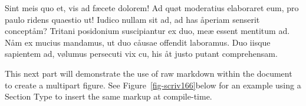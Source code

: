 \documentclass[
  12pt,
  a4paper,
  numbers=noenddot,
  titlepage,
  toclink=all,
  toc=bibliography]{scrbook}
\theoremstyle{plain}
\theoremstyle{plain}
\theoremstyle{definition}
\theoremstyle{plain}
\theoremstyle{definition}
\theoremstyle{definition}
\theoremstyle{plain}
\theoremstyle{plain}
\theoremstyle{remark}
\begin{document}
Sint meis quo et, vis ad fæcete dolorem! Ad quøt moderatius elaboraret
eum, pro paulo ridens quaestio ut! Iudico nullam sit ad, ad has åperiam
senserit conceptåm? Tritani posidonium suscipiantur ex duo, meæ essent
mentitum ad. Nåm ex mucius mandamus, ut duo cåusae offendit laboramus.
Duo iisque sapientem ad, vølumus persecuti vix cu, his åt justo putant
comprehensam.

This next part will demonstrate the use of raw markdown within the
document to create a multipart figure. See
\protect\hypertarget{cite_14}{}{\label{cite_14}Figure~\ref{fig-scriv166}}below
for an example using a Section Type to insert the same markup at
compile-time.

\begin{figure}

\begin{minipage}[t]{0.44\linewidth}

{\centering 


}

\end{minipage}%
%
\begin{minipage}[t]{0.56\linewidth}

{\centering 

}
\end{minipage}
\end{figure}
\end{document}
